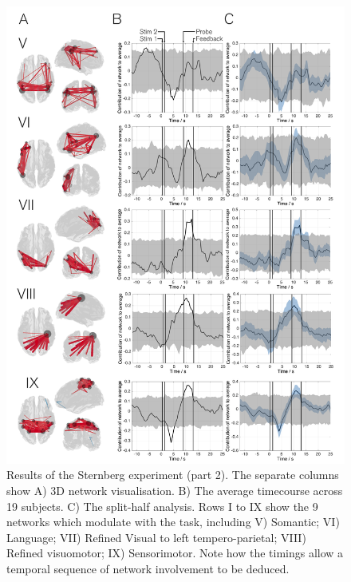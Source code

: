 		\begin{figure}[h!]
			\begin{center}
				\includegraphics[width=\linewidth]{./images/chapter6/figure_3b.png}
				\caption{Results of the Sternberg experiment (part 2). The separate columns show A) 3D network visualisation. B) The average timecourse across 19 subjects. C) The split-half analysis. Rows I to IX show the 9 networks which modulate with the task, including V) Somantic; VI) Language; VII) Refined Visual to left tempero-parietal; VIII) Refined visuomotor; IX) Sensorimotor. Note how the timings allow a temporal sequence of network involvement to be deduced.
					\label{fig_6_3b}}
			\end{center}
		\end{figure}


